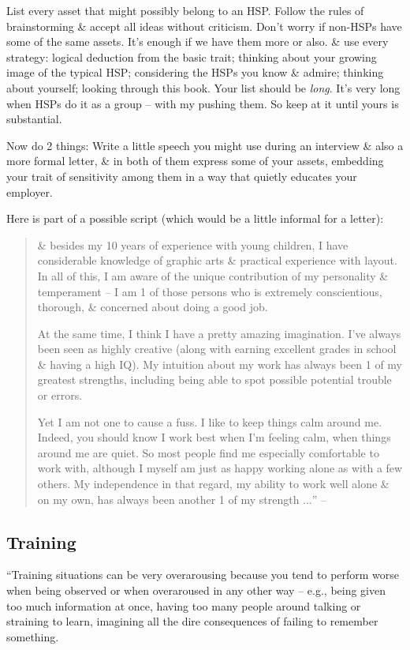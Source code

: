 \documentclass{article}
\numberwithin{equation}{section}
\begin{document}
List every asset that might possibly belong to an HSP. Follow the rules of brainstorming \& accept all ideas without criticism. Don't worry if non-HSPs have some of the same assets. It's enough if we have them more or also. \& use every strategy: logical deduction from the basic trait; thinking about your growing image of the typical HSP; considering the HSPs you know \& admire; thinking about yourself; looking through this book. Your list should be \textit{long}. It's very long when HSPs do it as a group -- with my pushing them. So keep at it until yours is substantial.

Now do 2 things: Write a little speech you might use during an interview \& also a more formal letter, \& in both of them express some of your assets, embedding your trait of sensitivity among them in a way that quietly educates your employer.

Here is part of a possible script (which would be a little informal for a letter):
\begin{quotation}
	\& besides my 10 years of experience with young children, I have considerable knowledge of graphic arts \& practical experience with layout. In all of this, I am aware of the unique contribution of my personality \& temperament -- I am 1 of those persons who is extremely conscientious, thorough, \& concerned about doing a good job.
	
	At the same time, I think I have a pretty amazing imagination. I've always been seen as highly creative (along with earning excellent grades in school \& having a high IQ). My intuition about my work has always been 1 of my greatest strengths, including being able to spot possible potential trouble or errors.
	
	Yet I am not one to cause a fuss. I like to keep things calm around me. Indeed, you should know I work best when I'm feeling calm, when things around me are quiet. So most people find me especially comfortable to work with, although I myself am just as happy working alone as with a few others. My independence in that regard, my ability to work well alone \& on my own, has always been another 1 of my strength $\ldots$'' -- \cite[pp. 162--163]{Aron2013}
\end{quotation}

\subsection{Training}
``Training situations can be very overarousing because you tend to perform worse when being observed or when overaroused in any other way -- e.g., being given too much information at once, having too many people around talking or straining to learn, imagining all the dire consequences of failing to remember something.
\end{document}

